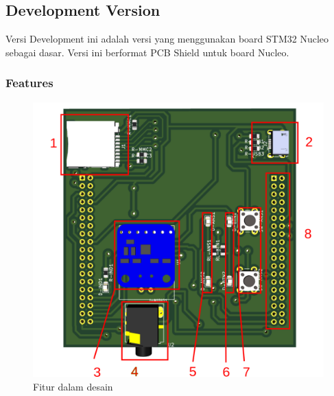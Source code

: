 \documentclass[12pt,]{article}
\begin{document}

	\newpage
	\subsection{Development Version}
	
	Versi Development ini adalah versi yang menggunakan board STM32 Nucleo sebagai dasar.
	Versi ini berformat PCB Shield untuk board Nucleo.
	
	\subsubsection{Features}
	\begin{figure}[!ht]
		\centering
		\includegraphics[width=500pt]{images/vdev.png}
		\caption{Fitur dalam desain}
	\end{figure}
\end{document}
